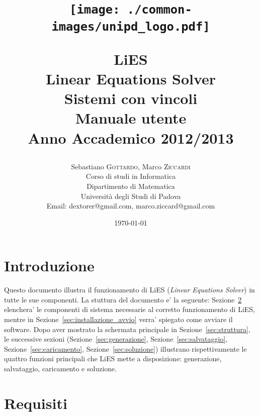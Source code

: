 \documentclass{article}
\title{
\begin{figure}[ht]
\begin{center}
\texttt{[image: ./common-images/unipd\_logo.pdf]}
\end{center}
\end{figure}
LiES \\ Linear Equations Solver \\ Sistemi con vincoli \\\vspace{10mm} \textbf{Manuale utente}\\\vspace{0.4cm}
\Large{Anno Accademico 2012/2013}}
\author{Sebastiano \textsc{Gottardo}, Marco \textsc{Ziccardi}\\
Corso di studi in Informatica\\
Dipartimento di Matematica\\
Università degli Studi di Padova\\
Email: dextorer@gmail.com, marco.ziccard@gmail.com }
\date{\today} %
\begin{document}
\maketitle %



\newpage
\tableofcontents
\newpage


\section{Introduzione}
\label{sec:introduzione}

Questo documento illustra il funzionamento di LiES (\textit{Linear Equations Solver}) in tutte le sue componenti. La stuttura del documento e' la seguente: Sezione~\ref{sec:requisiti} elenchera' le componenti di sistema necessarie al corretto funzionamento di LiES, mentre in Sezione~\ref{sec:installazione_avvio} verra' spiegato come avviare il software. Dopo aver mostrato la schermata principale in Sezione~\ref{sec:struttura}, le successive sezioni (Sezione~\ref{sec:generazione}, Sezione~\ref{sec:salvataggio}, Sezione~\ref{sec:caricamento}, Sezione~\ref{sec:soluzione}) illustrano rispettivamente le quattro funzioni principali che LiES mette a disposizione: generazione, salvataggio, caricamento e soluzione.


\section{Requisiti}
\label{sec:requisiti}
\end{document}

